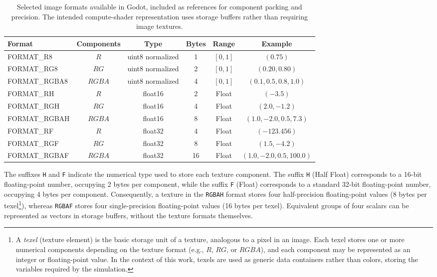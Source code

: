 \documentclass[12pt,a4paper]{article}
\begin{document}
	\begin{table}[ht]
	\centering
	\begin{tabular}{lccccc}
	\hline
	\textbf{Format} &
	\textbf{Components} &
	\textbf{Type} &
	\textbf{Bytes} &
	\textbf{Range} &
	\textbf{Example} \\
	\hline
	FORMAT\_R8     & $R$             & uint8 normalized   & 1  & $[0,1]$ & $(0.75)$ \\
	FORMAT\_RG8    & $RG$         & uint8 normalized   & 2  & $[0,1]$ & $(0.20,0.80)$ \\
	FORMAT\_RGBA8  & $RGBA$     & uint8 normalized   & 4  & $[0,1]$ & $(0.1,0.5,0.8,1.0)$ \\
	\hline
	FORMAT\_RH     & $R$             & float16            & 2  & Float & $(-3.5)$ \\
	FORMAT\_RGH    & $RG$         & float16            & 4  & Float & $(2.0,-1.2)$ \\
	FORMAT\_RGBAH  & $RGBA$     & float16            & 8  & Float & $(1.0,-2.0,0.5,7.3)$ \\
	\hline
	FORMAT\_RF     & $R$             & float32            & 4  & Float & $(-123.456)$ \\
	FORMAT\_RGF    & $RG$         & float32            & 8  & Float & $(1.5,-4.2)$ \\
	FORMAT\_RGBAF  & $RGBA$     & float32            & 16 & Float & $(1.0,-2.0,0.5,100.0)$ \\
	\hline
	\end{tabular}
	\caption{\footnotesize{Selected image formats available in Godot, included as references for component packing and precision. The intended compute-shader representation uses storage buffers rather than requiring image textures.}}
	\label{tab:image_formats}
	\end{table}
	
	The suffixes \texttt{H} and \texttt{F} indicate the numerical type used to store each texture component. The suffix \texttt{H} (Half Float) corresponds to a 16-bit floating-point number, occupying 2 bytes per component, while the suffix \texttt{F} (Float) corresponds to a standard 32-bit floating-point number, occupying 4 bytes per component. Consequently, a texture in the \texttt{RGBAH} format stores four half-precision floating-point values (8 bytes per texel\footnote{A \emph{texel} (texture element) is the basic storage unit of a texture, analogous to a pixel in an image. Each texel stores one or more numerical components depending on the texture format (e.g., $R$, $RG$, or $RGBA$), and each component may be represented as an integer or floating-point value. In the context of this work, texels are used as generic data containers rather than colors, storing the variables required by the simulation.}), whereas \texttt{RGBAF} stores four single-precision floating-point values (16 bytes per texel). Equivalent groups of four scalars can be represented as vectors in storage buffers, without the texture formats themselves. 
	
\end{document}
